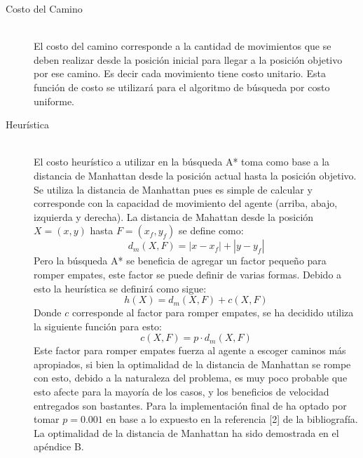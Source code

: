\documentclass[letter, titlepage, 10pt]{article}
\newcommand{\abs}[1]{\left\vert#1\right\vert}
\begin{document}
\begin{description}
    \item[Costo del Camino] \hfill \\
    El costo del camino corresponde a la cantidad de movimientos que se deben realizar desde la posición inicial para llegar a la posición objetivo por ese camino. Es decir cada movimiento tiene costo unitario. Esta función de costo se utilizará para el algoritmo de búsqueda por costo uniforme.
    
    \item[Heurística] \hfill \\
  El costo heurístico a utilizar en la búsqueda A* toma como base a la distancia de Manhattan desde la posición actual hasta la posición objetivo. Se utiliza la distancia de Manhattan pues es simple de calcular y corresponde con la capacidad de movimiento del agente (arriba, abajo, izquierda y derecha). La distancia de Mahattan desde la posición $X = (x,y)$ hasta $F = (x_f,y_f)$ se define como:
    \begin{displaymath}
      d_m(X,F) = \abs{x-x_f} + \abs{y-y_f} 
    \end{displaymath}
    Pero la búsqueda A* se beneficia de agregar un factor pequeño para romper empates, este factor se puede definir de varias formas.
  Debido a esto la heurística se definirá como sigue:   
  \begin{displaymath}
      h(X) = d_m(X,F) + c(X,F) 
    \end{displaymath}   
    Donde $c$ corresponde al factor para romper empates, se ha decidido utiliza la siguiente función para esto:
      \begin{displaymath}
          c(X,F) = p \cdot d_m(X,F)
        \end{displaymath}   
    Este factor para romper empates fuerza al agente a escoger caminos más apropiados, si bien la optimalidad de la distancia de Manhattan se rompe con esto, debido a la naturaleza del problema, es muy poco probable que esto afecte para la mayoría de los casos, y los beneficios de velocidad entregados son bastantes. Para la implementación final de ha optado por tomar $p = 0.001$ en base a lo expuesto en la referencia [2] de la bibliografía. La optimalidad de la distancia de Manhattan ha sido demostrada en el apéndice B.

\end{description}

\end{document}
